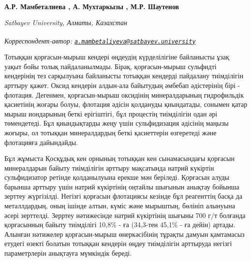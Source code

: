 
\begin{articleheader}

{\bfseries
А.Р. Мамбеталиева\textsuperscript{\envelope } ,
А. Мухтаркызы ,
М.Р. Шаутенов} 
\end{articleheader}

\begin{affiliation}
\emph{Satbayev University, Алматы, Казахстан}

\raggedright \textsuperscript{\envelope }{\em Корреспондент-автор: \href{mailto:a.mambetaliyeva@satbayev.university}{\nolinkurl{a.mambetaliyeva@satbayev.university}}}
\end{affiliation}

Тотыққан қорғасын-мырыш кендері өңдеудің күрделілігіне байланысты ұзақ
уақыт бойы толық пайдаланылмады. Бірақ, қорғасын-мырыш сульфидті
кендерінің тез сарқылуына байланысты тотыққан кендерді пайдалану
тиімділігін арттыру қажет. Оксид кендерін алдын-ала байытудың әмбебап
әдістерінің бірі - флотация. Дегенмен, қорғасын-мырыш оксидінің
минералдарының гидрофильдік қасиетінің жоғары болуы, флотация әдісін
қолдануды қиындатады, сонымен қатар мырыш иондарының беткі ерігіштігі,
бұл процестің тиімділігін одан әрі төмендетеді. Бұл қиындықтарды жеңу
үшін сульфидизация әдісінің маңызы жоғыры, ол тотыққан минералдардың
беткі қасиеттерін өзгеретеді және флотацияға дайындайды.

Бұл жұмыста Қосқұдық кен орнының тотыққан кен сынамасындағы қорғасын
минералдарын байыту тиімділігін арттыру мақсатында натрий күкіртін
сульфидизатор ретінде қолданылуына ерекше мән беріледі. Қорғасын алуды
барынша арттыру үшін натрий күкіртінің оңтайлы шығынын анықтау бойынша
зерттеу жүргізілді. Негізгі қорғасын флотациясы кезінде бұл реагенттің
басқа да металлдардың, оның ішінде алтын, күміс және мырыштың, бөлініп
алынуына әсері зерттелді. Зерртеу нәтижесінде натрий күкіртінің шығыны
700 г/т болғанда қорғасынның байыту тиімділігі 10,8\% - ға (34,3-тен
45,1\% - ға дейін) артады. Алынған нәтижелер қорғасын-мырыш
өнеркәсібінің тұрақты дамуын қамтамасыз етудегі өзекті болатын тотыққан
кендерін өңдеу тиімділігін арттыруда негізгі параметрлерін анықтауға
мүмкіндік береді.

